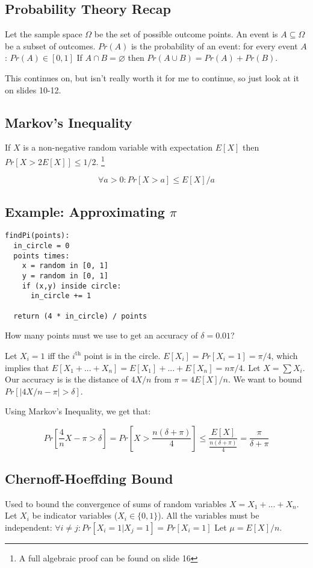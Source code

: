 \documentclass[a4paper]{article}
\begin{document}
\subsection{Probability Theory Recap}

Let the sample space $\Omega$ be the set of possible outcome points.
An event is $A \subseteq \Omega$ be a subset of outcomes.
$Pr(A)$ is the probability of an event:
for every event $A$: $Pr(A) \in [0, 1]$
If $A \cap B = \varnothing$ then $Pr(A \cup B) = Pr(A) + Pr(B)$.

This continues on, but isn't really worth it for me to continue, so just look at it on slides 10-12.

\subsection{Markov's Inequality}
If $X$ is a non-negative random variable with expectation $E[X]$ then $Pr[X > 2 E[X]] \le 1/2$.
\footnote{A full algebraic proof can be found on slide 16}

\[\forall a > 0 : Pr[X > a] \le E[X] / a\]

\subsection{Example: Approximating \texorpdfstring{$\pi$}{pi}}
\begin{lstlisting}[frame=L]
findPi(points):
  in_circle = 0
  points times:
    x = random in [0, 1]
    y = random in [0, 1]
    if (x,y) inside circle:
      in_circle += 1

  return (4 * in_circle) / points
\end{lstlisting}

How many points must we use to get an accuracy of $\delta=0.01$?

Let $X_i=1$ iff the $i^{\text{th}}$ point is in the circle.
$E[X_i]=Pr[X_i=1]=\pi / 4$, which implies that $E[X_1 + ... + X_n]=E[X_1] + ... + E[X_n] = n \pi / 4$.
Let $X=\sum X_i$. Our accuracy is is the distance of $4X / n$ from $\pi = 4 E[X] / n$.
We want to bound $Pr[|4X/n - \pi| > \delta]$.

Using Markov's Inequality, we get that:

\[Pr\left[\frac{4}{n} X - \pi > \delta \right] = Pr\left[X > \frac{n(\delta + \pi)}{4}\right] \le \frac{E[X]}{\frac{n(\delta+\pi)}{4}} = \frac{\pi}{\delta + \pi}\]

\subsection{Chernoff-Hoeffding Bound}
Used to bound the convergence of sums of random variables $X=X_1+...+X_n$.
Let $X_i$ be indicator variables ($X_i \in \{0, 1\}$).
All the variables must be independent: $\forall i \ne j: Pr[X_i=1|X_j=1] = Pr[X_i=1]$
Let $\mu = E[X] / n$.
\end{document}
